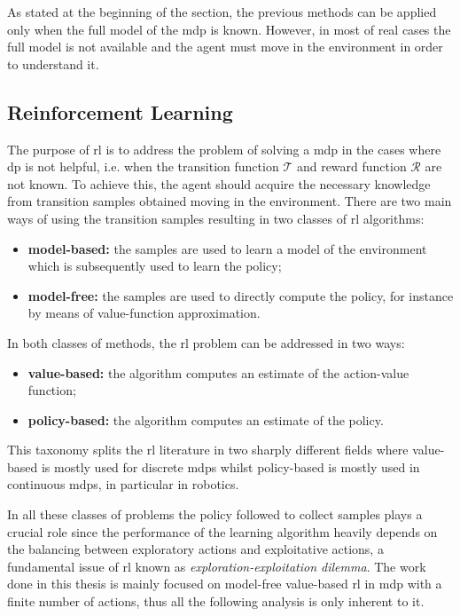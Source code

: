 As stated at the beginning of the section, the previous methods can be applied only when the full model of the \gls{mdp} is known. However, in most of real cases the full model is not available and the agent must move in the environment in order to understand it.

\subsection{Reinforcement Learning}
The purpose of \gls{rl} is to address the problem of solving a \gls{mdp} in the cases where \gls{dp} is not helpful, i.e. when the transition function $\mathcal{T}$ and reward function $\mathcal{R}$ are not known. To achieve this, the agent should acquire the necessary knowledge from transition samples obtained moving in the environment. There are two main ways of using the transition samples resulting in two classes of \gls{rl} algorithms:
\begin{itemize}
 \item \textbf{model-based:} the samples are used to learn a model of the environment which is subsequently used to learn the policy;
 \item \textbf{model-free:} the samples are used to directly compute the policy, for instance by means of value-function approximation.
\end{itemize}
In both classes of methods, the \gls{rl} problem can be addressed in two ways:
\begin{itemize}
 \item \textbf{value-based:} the algorithm computes an estimate of the action-value function;
 \item \textbf{policy-based:} the algorithm computes an estimate of the policy.
\end{itemize}
This taxonomy splits the \gls{rl} literature in two sharply different fields where value-based is mostly used for discrete \glspl{mdp} whilst policy-based is mostly used in continuous \glspl{mdp}, in particular in robotics.

In all these classes of problems the policy followed to collect samples plays a crucial role since the performance of the learning algorithm heavily depends on the balancing between exploratory actions and exploitative actions, a fundamental issue of \gls{rl} known as \textit{exploration-exploitation dilemma}. The work done in this thesis is mainly focused on model-free value-based \gls{rl} in \gls{mdp} with a finite number of actions, thus all the following analysis is only inherent to it.

